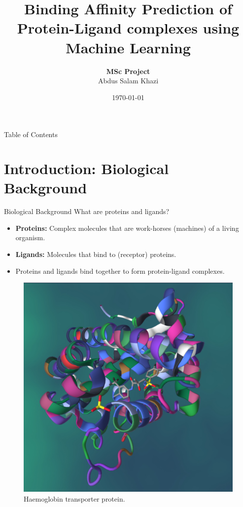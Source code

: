 \documentclass{beamer}
\title[Binding affinity prediction of PL complexes using ML]{Binding Affinity Prediction of Protein-Ligand complexes using Machine Learning}
\author[Abdus Salam Khazi]
{
    \textbf{MSc Project}\\
    Abdus Salam Khazi
}
\institute{Supervisors: \\
            \begin{tabular}{ll}
		    	Simon Bray \& Alireza Khanteymoori
		    \end{tabular}
}
\date{\today}
\begin{document}
\begin{frame}
\titlepage
\end{frame}

\begin{frame}{Table of Contents}
\tableofcontents
\end{frame}

\section{Introduction: Biological Background}

\begin{frame}[t]{Biological Background}
What are proteins and ligands? 
\begin{itemize}
\item \textbf{Proteins:} Complex molecules that are work-horses (machines) of a living organism.
\item \textbf{Ligands:} Molecules that bind to (receptor) proteins.

\item Proteins and ligands bind together to form protein-ligand complexes.

\end{itemize}

\begin{figure}[htb]
  \centering
    \includegraphics[scale=0.07]{images/pl_complex}
    \caption{Haemoglobin transporter protein.}
    \label{fig:HaemoglobinTransporterImage}
\end{figure}

\end{frame}
\end{document}
